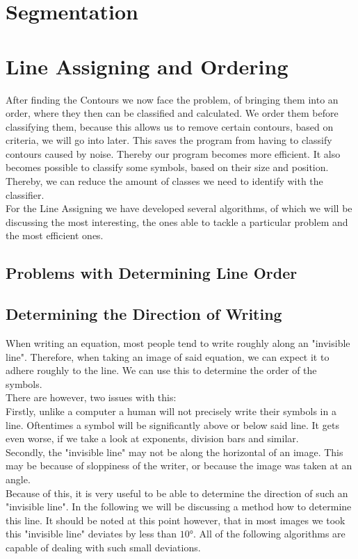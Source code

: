 \documentclass[12pt]{article}
\begin{document}
		
	
	
\section{Segmentation}

\section{Line Assigning and Ordering}
	After finding the Contours we now face the problem, of bringing them into an order, where they then can be classified and calculated.
	We order them before classifying them, because this allows us to remove certain contours, based on criteria, we will go into later.
	This saves the program from having to classify contours caused by noise.
	Thereby our program becomes more efficient.
	It also becomes possible to classify some symbols, based on their size and position.
	Thereby, we can reduce the amount of classes we need to identify with the classifier. \\
	For the Line Assigning we have developed several algorithms, of which we will be discussing the most interesting, the ones able to tackle a particular problem and the most efficient ones.
	
	\subsection{Problems with Determining Line Order}
	
	
	\subsection{Determining the Direction of Writing}
	When writing an equation, most people tend to write roughly along an "invisible line".
	Therefore, when taking an image of said equation, we can expect it to adhere roughly to the line.
	We can use this to determine the order of the symbols.\\
	There are however, two issues with this:\\
	Firstly, unlike a computer a human will not precisely write their symbols in a line.
	Oftentimes a symbol will be significantly above or below said line.
	It gets even worse, if we take a look at exponents, division bars and similar.\\
	Secondly, the "invisible line" may not be along the horizontal of an image.
	This may be because of sloppiness of the writer, or because the image was taken at an angle.\\
	Because of this, it is very useful to be able to determine the direction of such an "invisible line".
	In the following we will be discussing a method how to determine this line.
	It should be noted at this point however, that in most images we took this "invisible line" deviates by less than $10°$.
	All of the following algorithms are capable of dealing with such small deviations.\\
	
\end{document}
